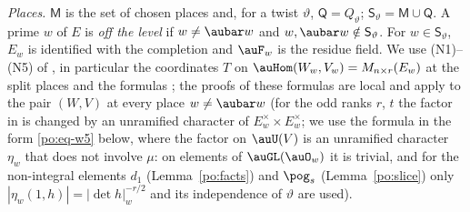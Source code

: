\documentclass[10pt]{amsart}
\theoremstyle{definition}
\theoremstyle{remark}
\begin{document}
\emph{Places.} $\mathsf M$ is the set of chosen places and, for a twist $\vartheta$,
$\mathsf Q=Q_\vartheta$; $\mathsf S_\vartheta=\mathsf M\cup\mathsf Q$. A prime $w$ of $E$ is
\emph{off the level} if $w\ne\aubar w$ and $w,\aubar w\notin\mathsf S_\vartheta$. For
$w\in\mathsf S_\vartheta$, $E_w$ is identified with the completion and $\auF_w$ is the residue
field. We use (N1)--(N5) of {\cite[\S6.1]{P49}}, in particular the coordinates $T$ on
$\auHom(W_w,V_w)=M_{n\times r}(E_w)$ at the split places and the formulas {\cite[(62) and~(63)]{P49}}; the proofs of these formulas are local and apply to the pair $(W,V)$ at every
place $w\ne\aubar w$ (for the odd ranks $r$, $t$ the factor in {\cite[(62)]{P49}} is changed by an
unramified character of $E_w^\times\times E_w^\times$; we use the formula in the form
\eqref{po:eq-w5} below, where the factor on $\auU(V)$ is an unramified character $\eta_w$ that does not
involve $\mu$: on elements of $\auGL(\auO_w)$ it is trivial, and for the non-integral elements $d_1$
(Lemma~\ref{po:facts}) and $\pog_s$ (Lemma~\ref{po:slice}) only $|\eta_w(1,h)|=|\det h|_w^{-r/2}$ and its
independence of $\vartheta$ are used).
\end{document}
